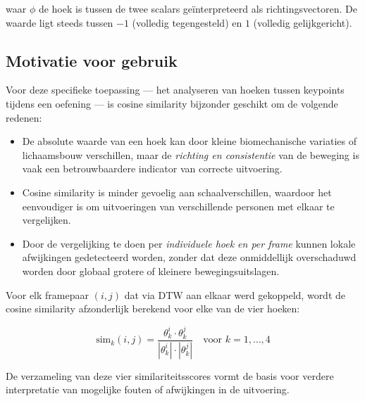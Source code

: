 waar $\phi$ de hoek is tussen de twee scalars geïnterpreteerd als richtingsvectoren. 
De waarde ligt steeds tussen $-1$ (volledig tegengesteld) en $1$ (volledig gelijkgericht).

\subsection{Motivatie voor gebruik}

Voor deze specifieke toepassing — het analyseren van hoeken tussen keypoints tijdens een oefening — is cosine similarity bijzonder geschikt om de volgende redenen:

\begin{itemize}
    \item De absolute waarde van een hoek kan door kleine biomechanische variaties of lichaamsbouw verschillen, maar de \textit{richting en consistentie} van de beweging is vaak een betrouwbaardere indicator van correcte uitvoering.
    \item Cosine similarity is minder gevoelig aan schaalverschillen, waardoor het eenvoudiger is om uitvoeringen van verschillende personen met elkaar te vergelijken.
    \item Door de vergelijking te doen per \textit{individuele hoek en per frame} kunnen lokale afwijkingen gedetecteerd worden, zonder dat deze onmiddellijk overschaduwd worden door globaal grotere of kleinere bewegingsuitslagen.
\end{itemize}

Voor elk framepaar $(i, j)$ dat via DTW aan elkaar werd gekoppeld, wordt de cosine similarity afzonderlijk berekend voor elke van de vier hoeken:

\[
\text{sim}_k(i,j) = \frac{\theta_k^i \cdot \theta_k^j}{|\theta_k^i| \cdot |\theta_k^j|} \quad \text{voor } k = 1,\dots,4
\]

De verzameling van deze vier similariteitsscores vormt de basis voor verdere interpretatie van mogelijke fouten of afwijkingen in de uitvoering.